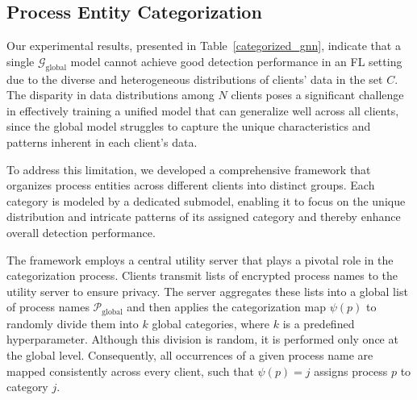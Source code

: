 \subsection{Process Entity Categorization}
\label{sys:catg}


Our experimental results, presented in Table~\ref{categorized_gnn}, indicate that a single \( \mathcal{G}_{\text{global}} \) model cannot achieve good detection performance in an FL setting due to the diverse and heterogeneous distributions of clients' data in the set \( C \). The disparity in data distributions among \( N \) clients poses a significant challenge in effectively training a unified model that can generalize well across all clients, since the global model struggles to capture the unique characteristics and patterns inherent in each client's data.

To address this limitation, we developed a comprehensive framework that organizes process entities across different clients into distinct groups. Each category is modeled by a dedicated submodel, enabling it to focus on the unique distribution and intricate patterns of its assigned category and thereby enhance overall detection performance.

The framework employs a central utility server that plays a pivotal role in the categorization process. Clients transmit lists of encrypted process names to the utility server to ensure privacy. The server aggregates these lists into a global list of process names \( \mathcal{P}_{\text{global}} \) and then applies the categorization map \( \psi(p) \) to randomly divide them into \( k \) global categories, where \( k \) is a predefined hyperparameter. Although this division is random, it is performed only once at the global level. Consequently, all occurrences of a given process name are mapped consistently across every client, such that \( \psi(p) = j \) assigns process \( p \) to category \( j \).

